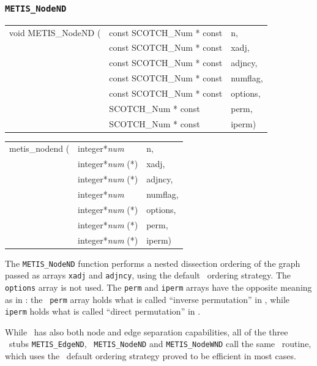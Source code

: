 \subsubsection{{\tt METIS\_NodeND}}

\begin{itemize}
\progsyn

{\tt\begin{tabular}{l@{}ll}
void METIS\_NodeND ( & const SCOTCH\_Num * const & n, \\
                     & const SCOTCH\_Num * const & xadj, \\
                     & const SCOTCH\_Num * const & adjncy, \\
                     & const SCOTCH\_Num * const & numflag, \\
                     & const SCOTCH\_Num * const & options, \\
                     & SCOTCH\_Num * const       & perm, \\
                     & SCOTCH\_Num * const       & iperm)
\end{tabular}}

{\tt\begin{tabular}{l@{}ll}
metis\_nodend ( & integer*{\it num}     & n, \\
                & integer*{\it num} (*) & xadj, \\
                & integer*{\it num} (*) & adjncy, \\
                & integer*{\it num}     & numflag, \\
                & integer*{\it num} (*) & options, \\
                & integer*{\it num} (*) & perm, \\
                & integer*{\it num} (*) & iperm)
\end{tabular}}

\progdes

The {\tt METIS\_NodeND} function performs a nested dissection ordering
of the graph passed as arrays {\tt xadj} and {\tt adjncy}, using
the default \scotch\ ordering strategy. The {\tt options} array is not
used. The {\tt perm} and {\tt iperm} arrays have the opposite meaning
as in \scotch: the \metis\ {\tt perm} array holds what is called
``inverse permutation'' in \scotch, while {\tt iperm} holds what is
called ``direct permutation'' in \scotch.

While \scotch\ has also both node and edge separation capabilities,
all of the three \metis\ stubs {\tt METIS\_\lbo EdgeND}, {\tt
METIS\_\lbo NodeND} and {\tt METIS\_\lbo NodeWND} call the same
\scotch\ routine, which uses the \scotch\ default ordering strategy
proved to be efficient in most cases.
\end{itemize}

